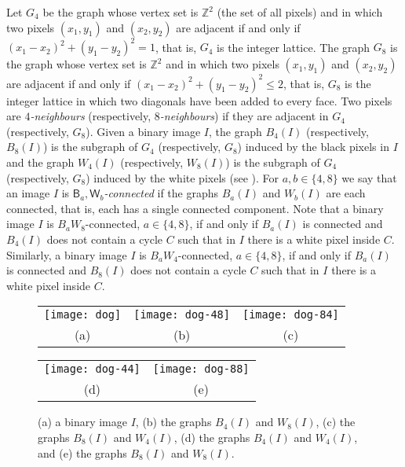 \documentclass[lotsofwhite,charterfonts]{patmorin}
\newcommand{\Z}{\mathbb{Z}}
\begin{document}
Let $G_4$ be the graph whose vertex set is $\Z^2$ (the set of all
pixels) and in which two pixels $(x_1,y_1)$ and $(x_2,y_2)$ are
adjacent if and only if $(x_1-x_2)^2+(y_1-y_2)^2=1$, that is, $G_4$ is the integer lattice.  The graph $G_8$ is the graph whose vertex set is $\Z^2$ and
in which two pixels $(x_1,y_1)$ and $(x_2,y_2)$ are adjacent if and only if
$(x_1-x_2)^2+(y_1-y_2)^2\le 2$, that is, $G_8$ is the integer lattice in
which two diagonals have been added to every face. Two pixels are \emph{$4$-neighbours} (respectively, \emph{$8$-neighbours}) if they are adjacent in $G_4$  (respectively, $G_8$). Given a binary image $I$, the graph $B_4(I)$ (respectively, $B_8(I)$) is the subgraph of $G_4$ (respectively, $G_8$) induced by the black pixels in $I$ and the graph $W_4(I)$ (respectively, $W_8(I)$) is the subgraph of $G_4$ (respectively, $G_8$) induced by the white pixels (see ). For $a,b\in\{4,8\}$ we say that an image $I$ is \emph{$\textsf{B}_a,\textsf{W}_b$-connected} if the graphs $B_a(I)$ and $W_b(I)$ are each connected, that is, each has a single connected component. Note that a binary image $I$ is $B_aW_8$-connected, $a\in\{4,8\}$, if and only if $B_a(I)$ is connected and $B_4(I)$ does not contain a cycle $C$ such that in $I$ there is a white pixel inside $C$. Similarly, a binary image $I$ is $B_aW_4$-connected, $a\in\{4,8\}$, if and only if $B_a(I)$ is connected and $B_8(I)$ does not contain a cycle $C$ such that in $I$ there is a white pixel inside $C$. 

\begin{figure}[htbp]
\begin{center}\begin{tabular}{ccc}
\texttt{[image: dog]} & 
\texttt{[image: dog-48]} &
\texttt{[image: dog-84]} \\
(a) & (b) & (c) \\
\end{tabular}\end{center}
\begin{center}\begin{tabular}{cc}
\texttt{[image: dog-44]} & \texttt{[image: dog-88]} \\
(d) & (e) \\
\end{tabular}\end{center}
\caption{(a) a binary image $I$, (b) the graphs $B_4(I)$ and $W_8(I)$, (c)
the graphs $B_8(I)$ and $W_4(I)$, (d) the graphs $B_4(I)$ and $W_4(I)$, and (e) the graphs $B_8(I)$ and $W_8(I)$.}
\end{figure}
\end{document}
